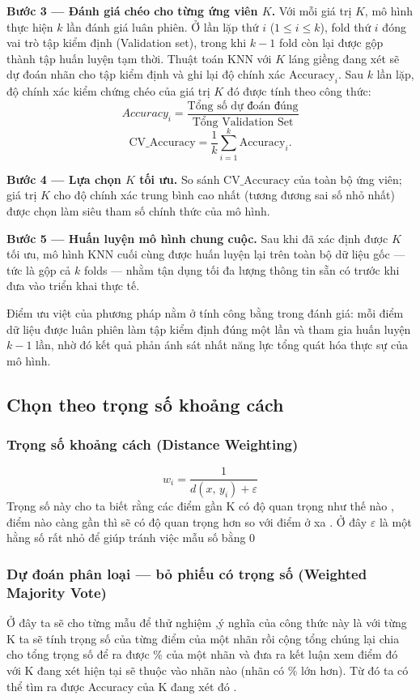 \documentclass[12pt,a4paper]{article}
\begin{document}
\textbf{Bước 3 — Đánh giá chéo cho từng ứng viên $K$.} Với mỗi giá trị
$K$, mô hình thực hiện $k$ lần đánh giá luân phiên. Ở lần lặp thứ $i$
($1 \le i \le k$), fold thứ $i$ đóng vai trò tập kiểm định (Validation
set), trong khi $k - 1$ fold còn lại được gộp thành tập huấn luyện tạm
thời. Thuật toán KNN với $K$ láng giềng đang xét sẽ dự đoán nhãn cho
tập kiểm định và ghi lại độ chính xác $\mathrm{Accuracy}_i$. Sau $k$
lần lặp, độ chính xác kiểm chứng chéo của giá trị $K$ đó được tính theo
công thức:
\begin{equation}
    Accuracy_i=\frac{\text{Tổng số dự đoán đúng}}{\text{Tổng Validation Set}}
\end{equation}
\begin{equation}
    \mathrm{CV\_Accuracy} = \frac{1}{k} \sum_{i=1}^{k} \mathrm{Accuracy}_i.
\end{equation}

\textbf{Bước 4 — Lựa chọn $K$ tối ưu.} So sánh $\mathrm{CV\_Accuracy}$
của toàn bộ ứng viên; giá trị $K$ cho độ chính xác trung bình cao nhất
(tương đương sai số nhỏ nhất) được chọn làm siêu tham số chính thức của
mô hình.

\textbf{Bước 5 — Huấn luyện mô hình chung cuộc.} Sau khi đã xác định
được $K$ tối ưu, mô hình KNN cuối cùng được huấn luyện lại trên toàn bộ
dữ liệu gốc — tức là gộp cả $k$ folds — nhằm tận dụng tối đa lượng
thông tin sẵn có trước khi đưa vào triển khai thực tế.

Điểm ưu việt của phương pháp nằm ở tính công bằng trong đánh giá: mỗi
điểm dữ liệu được luân phiên làm tập kiểm định đúng một lần và tham gia
huấn luyện $k - 1$ lần, nhờ đó kết quả phản ánh sát nhất năng lực tổng
quát hóa thực sự của mô hình.
\subsection{Chọn theo trọng số khoảng cách }
\subsubsection{Trọng số khoảng cách (Distance Weighting)}
\begin{equation}
    w_i = \frac{1}{d(x,\, y_i) + \varepsilon}
\end{equation} 
Trọng số này cho ta biết rằng các điểm gần K có độ quan trọng như thế nào , điểm nào càng gần thì sẽ có độ quan trọng hơn so với điểm ở xa . Ở đây $\varepsilon$ là một hằng số rất nhỏ để giúp tránh việc mẫu số bằng 0 
\subsubsection{Dự đoán phân loại — bỏ phiếu có trọng số (Weighted Majority Vote)}
Ở đây ta sẽ cho từng mẫu để thử nghiệm ,ý nghĩa của công thức này là với từng K ta sẽ tính trọng số của từng điểm của một nhãn rồi cộng tổng chúng lại chia cho tổng trọng số để ra được \% của một nhãn và đưa ra kết luận xem điểm đó với K đang xét hiện tại sẽ thuộc vào nhãn nào (nhãn có \% lớn hơn). Từ đó ta có thể tìm ra được Accuracy của K đang xét đó .
\end{document}
